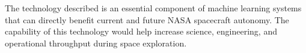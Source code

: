 The technology described is an essential component of machine learning systems 
that can directly benefit current and future NASA spacecraft autonomy. The 
capability of this technology would help increase science, engineering, and 
operational throughput during space exploration.
